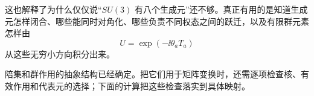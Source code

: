 这也解释了为什么仅仅说“$SU(3)$ 有八个生成元”还不够。真正有用的是知道生成元怎样闭合、哪些能同时对角化、哪些负责不同权态之间的跃迁，以及有限群元素怎样由
\[
U=\exp(-\ii\theta_aT_a)
\]
从这些无穷小方向积分出来。


陪集和群作用的抽象结构已经确定。把它们用于矩阵变换时，还需逐项检查核、有效作用和代表元的选择；下面的计算把这些检查落实到具体映射。




